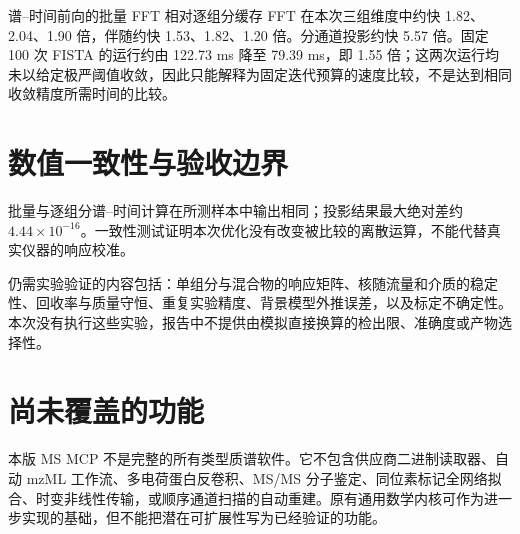 谱--时间前向的批量 FFT 相对逐组分缓存 FFT 在本次三组维度中约快 1.82、2.04、1.90 倍，伴随约快 1.53、1.82、1.20 倍。分通道投影约快 5.57 倍。固定 100 次 FISTA 的运行约由 122.73 ms 降至 79.39 ms，即 1.55 倍；这两次运行均未以给定极严阈值收敛，因此只能解释为固定迭代预算的速度比较，不是达到相同收敛精度所需时间的比较。

\section{数值一致性与验收边界}
批量与逐组分谱--时间计算在所测样本中输出相同；投影结果最大绝对差约 $4.44\times10^{-16}$。一致性测试证明本次优化没有改变被比较的离散运算，不能代替真实仪器的响应校准。

仍需实验验证的内容包括：单组分与混合物的响应矩阵、核随流量和介质的稳定性、回收率与质量守恒、重复实验精度、背景模型外推误差，以及标定不确定性。本次没有执行这些实验，报告中不提供由模拟直接换算的检出限、准确度或产物选择性。

\section{尚未覆盖的功能}
本版 MS MCP 不是完整的所有类型质谱软件。它不包含供应商二进制读取器、自动 mzML 工作流、多电荷蛋白反卷积、MS/MS 分子鉴定、同位素标记全网络拟合、时变非线性传输，或顺序通道扫描的自动重建。原有通用数学内核可作为进一步实现的基础，但不能把潜在可扩展性写为已经验证的功能。
